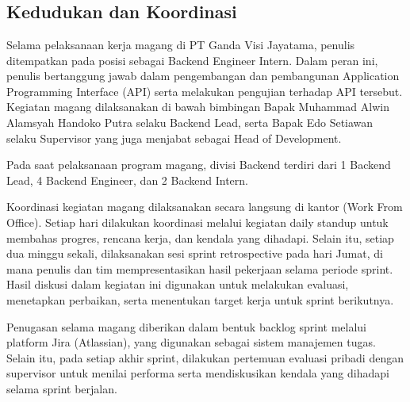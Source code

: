 \chapter{\babTiga}



\section{Kedudukan dan Koordinasi}

Selama pelaksanaan kerja magang di PT Ganda Visi Jayatama, penulis ditempatkan 
pada posisi sebagai Backend Engineer Intern. Dalam peran ini, penulis bertanggung jawab 
dalam pengembangan dan pembangunan Application Programming Interface (API) serta melakukan 
pengujian terhadap API tersebut. Kegiatan magang dilaksanakan di bawah bimbingan 
Bapak Muhammad Alwin Alamsyah Handoko Putra selaku Backend Lead, serta 
Bapak Edo Setiawan selaku Supervisor yang juga menjabat sebagai Head of Development.

Pada saat pelaksanaan program magang, divisi Backend terdiri dari 1 Backend Lead, 
4 Backend Engineer, dan 2 Backend Intern.

Koordinasi kegiatan magang dilaksanakan secara langsung di kantor (Work From Office). 
Setiap hari dilakukan koordinasi melalui kegiatan daily standup untuk membahas progres, 
rencana kerja, dan kendala yang dihadapi. Selain itu, setiap dua minggu sekali, 
dilaksanakan sesi sprint retrospective pada hari Jumat, di mana penulis dan tim mempresentasikan 
hasil pekerjaan selama periode sprint. Hasil diskusi dalam kegiatan ini digunakan untuk 
melakukan evaluasi, menetapkan perbaikan, serta menentukan target kerja untuk sprint berikutnya.

Penugasan selama magang diberikan dalam bentuk backlog sprint melalui platform Jira (Atlassian), 
yang digunakan sebagai sistem manajemen tugas. Selain itu, pada setiap akhir sprint, 
dilakukan pertemuan evaluasi pribadi dengan supervisor untuk menilai performa serta 
mendiskusikan kendala yang dihadapi selama sprint berjalan.


